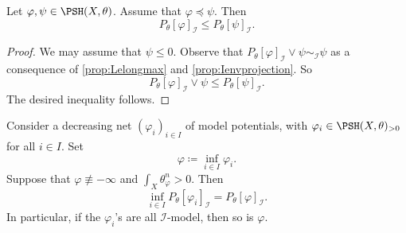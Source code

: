\begin{lemma}\label{lma:PIenvmono1}
    Let $\varphi,\psi\in \PSH(X,\theta)$. Assume that $\varphi\preceq \psi$. Then
    \[
        P_{\theta}[\varphi]_{\mathcal{I}}\leq P_{\theta}[\psi]_{\mathcal{I}}.
    \]
\end{lemma}
\begin{proof}
    We may assume that $\psi\leq 0$.
    Observe that $P_{\theta}[\varphi]_{\mathcal{I}}\lor \psi\sim_{\mathcal{I}} \psi$ as a consequence of \cref{prop:Lelongmax} and \cref{prop:Ienvprojection}. So
    \[
    P_{\theta}[\varphi]_{\mathcal{I}}\lor \psi\leq P_{\theta}[\psi]_{\mathcal{I}}.
    \]
    The desired inequality follows.
\end{proof}

\begin{proposition}\label{prop:decnetmodelPI}
    Consider a decreasing net $(\varphi_i)_{i\in I}$ of model potentials, with $\varphi_i\in \PSH(X,\theta)_{>0}$ for all $i\in I$. Set
    \[
    \varphi\coloneqq \inf_{i\in I}\varphi_i.
    \]
    Suppose that $\varphi\not\equiv -\infty$ and $\int_X \theta_{\varphi}^n>0$. Then
    \[
        \inf_{i\in I} P_{\theta}[\varphi_i]_{\mathcal{I}}=P_{\theta}[\varphi]_{\mathcal{I}}.
    \]
    In particular, if the $\varphi_i$'s are all $\mathcal{I}$-model, then so is $\varphi$.
\end{proposition}
